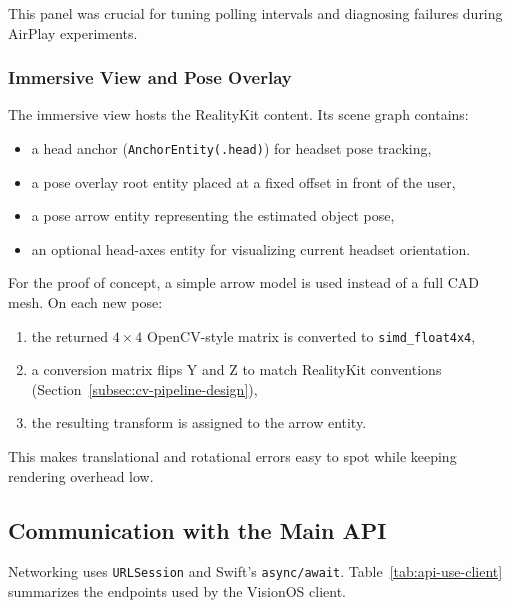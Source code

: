 This panel was crucial for tuning polling intervals and diagnosing failures during AirPlay experiments.

\subsubsection{Immersive View and Pose Overlay}

The immersive view hosts the RealityKit content. Its scene graph contains:

\begin{itemize}
    \item a head anchor (\texttt{AnchorEntity(.head)}) for headset pose tracking,
    \item a pose overlay root entity placed at a fixed offset in front of the user,
    \item a pose arrow entity representing the estimated object pose,
    \item an optional head-axes entity for visualizing current headset orientation.
\end{itemize}

For the proof of concept, a simple arrow model is used instead of a full CAD mesh. On each new pose:

\begin{enumerate}
    \item the returned $4\times 4$ OpenCV-style matrix is converted to \texttt{simd\_float4x4},
    \item a conversion matrix flips Y and Z to match RealityKit conventions (Section~\ref{subsec:cv-pipeline-design}),
    \item the resulting transform is assigned to the arrow entity.
\end{enumerate}

This makes translational and rotational errors easy to spot while keeping rendering overhead low.

\subsection{Communication with the Main API}

Networking uses \texttt{URLSession} and Swift’s \texttt{async/await}. Table~\ref{tab:api-use-client} summarizes the endpoints used by the VisionOS client.

